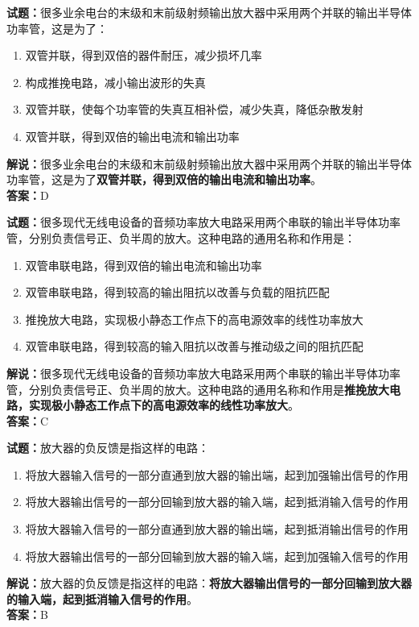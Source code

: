 \documentclass{ctexbook}
\begin{document}
\vspace{1em}

\textbf{试题：}很多业余电台的末级和末前级射频输出放大器中采用两个并联的输出半导体功率管，这是为了：
\begin{enumerate}[leftmargin=3em]
  \item 双管并联，得到双倍的器件耐压，减少损坏几率
  \item 构成推挽电路，减小输出波形的失真
  \item 双管并联，使每个功率管的失真互相补偿，减少失真，降低杂散发射
  \item 双管并联，得到双倍的输出电流和输出功率
\end{enumerate}
\noindent\textbf{解说：}很多业余电台的末级和末前级射频输出放大器中采用两个并联的输出半导体功率管，这是为了\textbf{双管并联，得到双倍的输出电流和输出功率}。\\\noindent\textbf{答案：}D

\vspace{1em}

\textbf{试题：}很多现代无线电设备的音频功率放大电路采用两个串联的输出半导体功率管，分别负责信号正、负半周的放大。这种电路的通用名称和作用是：
\begin{enumerate}[leftmargin=3em]
  \item 双管串联电路，得到双倍的输出电流和输出功率
  \item 双管串联电路，得到较高的输出阻抗以改善与负载的阻抗匹配
  \item 推挽放大电路，实现极小静态工作点下的高电源效率的线性功率放大
  \item 双管串联电路，得到较高的输入阻抗以改善与推动级之间的阻抗匹配
\end{enumerate}
\noindent\textbf{解说：}很多现代无线电设备的音频功率放大电路采用两个串联的输出半导体功率管，分别负责信号正、负半周的放大。这种电路的通用名称和作用是\textbf{推挽放大电路，实现极小静态工作点下的高电源效率的线性功率放大}。\\\noindent\textbf{答案：}C

\vspace{1em}

\textbf{试题：}放大器的负反馈是指这样的电路：
\begin{enumerate}[leftmargin=3em]
  \item 将放大器输入信号的一部分直通到放大器的输出端，起到加强输出信号的作用
  \item 将放大器输出信号的一部分回输到放大器的输入端，起到抵消输入信号的作用
  \item 将放大器输入信号的一部分直通到放大器的输出端，起到抵消输出信号的作用
  \item 将放大器输出信号的一部分回输到放大器的输入端，起到加强输入信号的作用

\end{enumerate}
\noindent\textbf{解说：}放大器的负反馈是指这样的电路：\textbf{将放大器输出信号的一部分回输到放大器的输入端，起到抵消输入信号的作用}。\\\noindent\textbf{答案：}B
\end{document}
